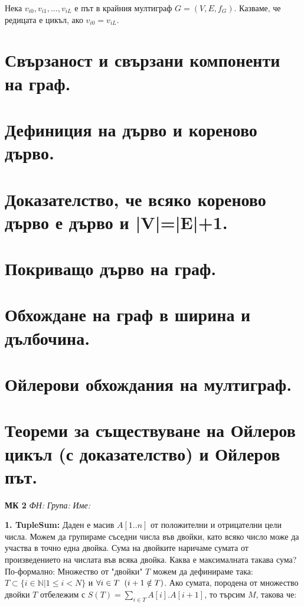 \documentclass[fleqn,12pt]{article}
\begin{document}
\begin{flushleft}
Нека $v_{i0}, v_{i1}, \dots, v_{iL}$ е път в крайния мултиграф $G = (V, E, f_G)$.
Казваме, че редицата е цикъл, ако $v_{i0} = v_{iL}$.

\section{Свързаност и свързани компоненти на граф.} 
\section{Дефиниция на дърво и кореново дърво.}
\section{Доказателство, че всяко кореново дърво е дърво и |V|=|E|+1.}
\section{Покриващо дърво на граф.}
\section{Обхождане на граф в ширина и дълбочина.}
\section{Ойлерови обхождания на мултиграф.}
\section{Теореми за съществуване на Ойлеров цикъл (с доказателство) и Ойлеров път.}

\textbf{МК 2} \hspace{5mm}\textit{ФН:} \hspace{5mm} \hspace{20mm} \textit{Група: } \hspace{10mm} \textit{Име: } \\
\vspace{5mm}

\textbf{1. TupleSum:} Даден е масив $A[1..n]$ от положителни и отрицателни цели числа. Можем да групираме съседни числа във двойки, като всяко число може да участва в точно една двойка. Сума на двойките наричаме сумата от произведението на числата във всяка двойка. Каква е максималната такава сума? \\

По-формално: Множество от "двойки" \hspace{1mm} $T$ можем да дефинираме така: $T \subset \{ i \in \mathbb{N} | 1 \leq i < N \}$ и $\forall i \in T \hspace{2mm} (i + 1 \notin T)$. Ако сумата, породена от множество двойки $T$ отбележим с $S(T) = \sum_{i \in T} A[i] . A[i+1]$, то търсим $M$, такова че:


\end{flushleft}
\end{document}
